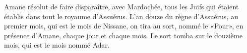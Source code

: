 Amane résolut de faire disparaître, avec Mardochée,
	tous les Juifs qui étaient établis dans tout le royaume d’Assuérus.
L’an douze du règne d’Assuérus, au premier mois, qui est le mois de Nissane,
	on tira au sort, nommé le «Pour», en présence d’Amane, chaque jour et chaque mois.
Le sort tomba sur le douzième mois, qui est le mois nommé Adar.